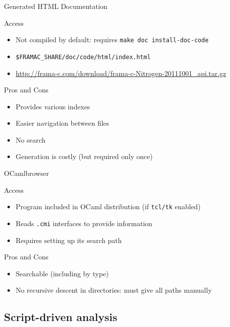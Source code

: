 \begin{frame}[fragile]{Generated HTML Documentation}
\begin{block}{Access}
\begin{itemize}
\item Not compiled by default: requires \verb|make doc install-doc-code|
\item \verb|$FRAMAC_SHARE/doc/code/html/index.html|
\item \url{http://frama-c.com/download/frama-c-Nitrogen-20111001_api.tar.gz}
\end{itemize}
\end{block}
\begin{block}{Pros and Cons}
\begin{itemize}
\item[\pros] Provides various indexes
\item[\pros] Easier navigation between files
\item[\cons] No search
\item[\cons] Generation is costly (but required only once)
\end{itemize}
\end{block}
\end{frame}

\begin{frame}{OCamlbrowser}
\begin{block}{Access}
\begin{itemize}
\item Program included in OCaml distribution (if \texttt{tcl/tk} enabled)
\item Reads \texttt{.cmi} interfaces to provide information
\item Requires setting up its search path
\end{itemize}
\end{block}
\begin{block}{Pros and Cons}
\begin{itemize}
\item[\pros] Searchable (including by type)
\item[\cons] No recursive descent in directories: must give all paths manually
\end{itemize}
\end{block}
\end{frame}

\subsection{Script-driven analysis}


